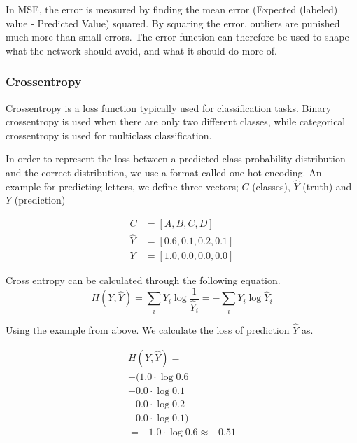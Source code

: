 In MSE, the error is measured by finding the mean error (Expected (labeled) value - Predicted Value) squared. By squaring the error, outliers are punished much more than small errors. The error function can therefore be used to shape what the network should avoid, and what it should do more of.

\subsubsection{Crossentropy}
\label{categorical-crossentropy}

Crossentropy is a loss function typically used for classification tasks. Binary crossentropy is used when there are only two different classes, while categorical crossentropy is used for multiclass classification.

In order to represent the loss between a predicted class probability distribution and the correct distribution, we use a format called one-hot encoding. An example for predicting letters, we define three vectors; $C$ (classes), $\hat{Y}$ (truth) and $Y$ (prediction)
\cite{brownlee_how_2017}


\begin{equation} \label{eqn:catcross_ex1}
\begin{split}
    C &= [A, B, C, D] \\
    \hat{Y} &= [0.6, 0.1, 0.2, 0.1] \\
    Y &= [1.0, 0.0, 0.0, 0.0]
\end{split}
\end{equation}

%
Cross entropy can be calculated through the following equation.
%
\begin{equation} \label{eqn:catcross_ex2}
    H(Y, \hat{Y}) = \sum_i Y_i \log \frac{1}{\hat{Y}_i} = -\sum_i Y_i \log \hat{Y}_i
\end{equation}

Using the example from above. We calculate the loss of prediction $\hat{Y}$ as.

\begin{equation} \label{eqn:catcross_ex3}
\begin{split}
    H(Y, \hat{Y}) = \\
    -( 1.0 \cdot \log 0.6\\
    + 0.0 \cdot \log 0.1\\
    + 0.0 \cdot \log 0.2\\
    + 0.0 \cdot \log 0.1) \\
    = - 1.0 \cdot \log 0.6 \approx -0.51
\end{split}
\end{equation}

